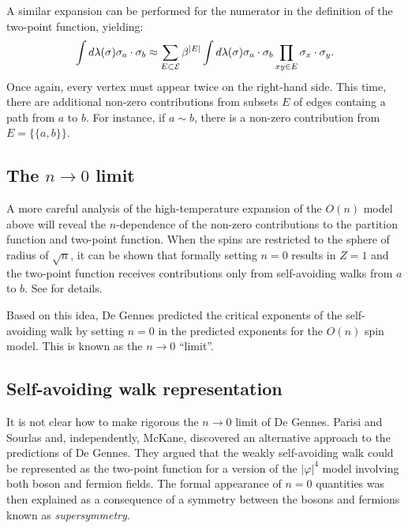A similar expansion can be performed for the numerator in the definition of the
two-point function, yielding:
\begin{equation}
\int d\lambda(\sigma) \sigma_a \cdot \sigma_b
	\approx
\sum_{E\subset\mathcal{E}} \beta^{|E|}
\int d\lambda(\sigma) \sigma_a \cdot \sigma_b
\prod_{xy\in E} \sigma_x \cdot \sigma_y.
\end{equation}
Once again, every vertex must appear twice on the right-hand side. This time,
there are additional non-zero contributions from subsets $E$ of edges containg
a path from $a$ to $b$. For instance, if $a \sim b$, there is a non-zero
contribution from $E = \{ \{ a, b \} \}$.


\subsection{The \texorpdfstring{$n\to0$}{n approaches 0} limit}

A more careful analysis of the high-temperature expansion of the $O(n)$ model
above will reveal the $n$-dependence of the non-zero contributions to the
partition function and two-point function. When the spins are restricted to
the sphere of radius of $\sqrt n$, it can be shown that formally setting $n = 0$
results in $Z = 1$ and the two-point function receives contributions only from
self-avoiding walks from $a$ to $b$. See \cite[Section 2.3]{MS93} for details.

Based on this idea, De Gennes predicted the critical exponents of the self-avoiding
walk by setting $n = 0$ in the predicted exponents for the $O(n)$ spin model.
This is known as the $n \to 0$ ``limit''.


\subsection{Self-avoiding walk representation}
\label{sec:intrep}

It is not clear how to make rigorous the $n\to0$ limit of De Gennes. Parisi and
Sourlas and, independently, McKane, discovered an alternative approach to the
predictions of De Gennes. They argued that the weakly
self-avoiding walk  could be represented as the two-point
function for a version of the $|\varphi|^4$ model involving both boson and fermion
fields. The formal appearance of $n = 0$ quantities was then explained as a
consequence of a symmetry between the bosons and fermions known as \emph{supersymmetry}.

